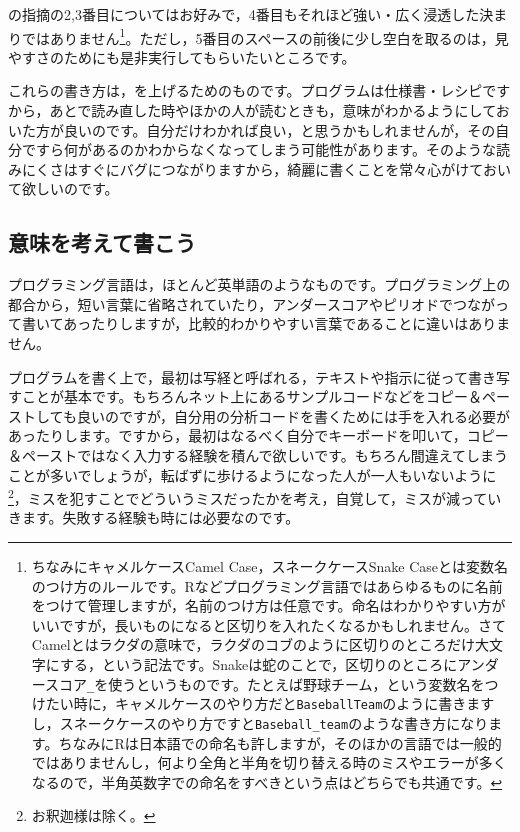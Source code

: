 \documentclass{ltjsbook}
\begin{document}
\citep{松浦201610}の指摘の2,3番目についてはお好みで，4番目もそれほど強い・広く浸透した決まりではありません\footnote{ちなみにキャメルケースCamel Case，スネークケースSnake Caseとは変数名のつけ方のルールです。Rなどプログラミング言語ではあらゆるものに名前をつけて管理しますが，名前のつけ方は任意です。命名はわかりやすい方がいいですが，長いものになると区切りを入れたくなるかもしれません。さてCamelとはラクダの意味で，ラクダのコブのように区切りのところだけ大文字にする，という記法です。Snakeは蛇のことで，区切りのところにアンダースコア\verb|_|を使うというものです。たとえば野球チーム，という変数名をつけたい時に，キャメルケースのやり方だと\texttt{BaseballTeam}のように書きますし，スネークケースのやり方ですと\verb|Baseball_team|のような書き方になります。ちなみにRは日本語での命名も許しますが，そのほかの言語では一般的ではありませんし，何より全角と半角を切り替える時のミスやエラーが多くなるので，半角英数字での命名をすべきという点はどちらでも共通です。}。ただし，5番目のスペースの前後に少し空白を取るのは，見やすさのためにも是非実行してもらいたいところです。

これらの書き方は，を上げるためのものです。プログラムは仕様書・レシピですから，あとで読み直した時やほかの人が読むときも，意味がわかるようにしておいた方が良いのです。自分だけわかれば良い，と思うかもしれませんが，その自分ですら何があるのかわからなくなってしまう可能性があります。そのような読みにくさはすぐにバグにつながりますから，綺麗に書くことを常々心がけておいて欲しいのです。

\subsection{意味を考えて書こう}
プログラミング言語は，ほとんど英単語のようなものです。プログラミング上の都合から，短い言葉に省略されていたり，アンダースコアやピリオドでつながって書いてあったりしますが，比較的わかりやすい言葉であることに違いはありません。

プログラムを書く上で，最初は写経と呼ばれる，テキストや指示に従って書き写すことが基本です。もちろんネット上にあるサンプルコードなどをコピー＆ペーストしても良いのですが，自分用の分析コードを書くためには手を入れる必要があったりします。ですから，最初はなるべく自分でキーボードを叩いて，コピー＆ペーストではなく入力する経験を積んで欲しいです。もちろん間違えてしまうことが多いでしょうが，転ばずに歩けるようになった人が一人もいないように\footnote{お釈迦様は除く。}，ミスを犯すことでどういうミスだったかを考え，自覚して，ミスが減っていきます。失敗する経験も時には必要なのです。
\end{document}

